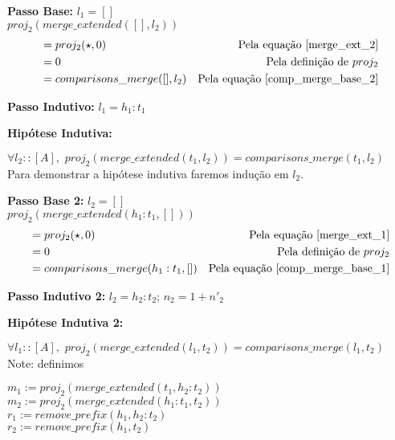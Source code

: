 \documentclass[12pt, oneside, a4paper,english,brazil]{abntex2}
\begin{document}
\textbf{Passo Base: } $l_{1} = []$\\

$proj_{2}(merge\_extended([], l_{2}))$
\begin{align*}
  &= proj_{2}(\star, 0) &\text{Pela equa\c{c}\~ao \ref{merge_ext_2}} \\
                                       &= 0 &\text{Pela defini\c{c}\~ao de $proj_{2}$} \\
  &= comparisons\_merge([], l_{2}) &\text{Pela equa\c{c}\~ao \ref{comp_merge_base_2}} \\
\end{align*}

\textbf{Passo Indutivo: } $l_{1} = h_{1} : t_{1}$

\textbf{Hip\'otese Indutiva: }


\qquad $\forall l_{2} :: [A], \,\, proj_{2}(merge\_extended(t_{1}, l_{2})) = comparisons\_merge(t_{1}, l_{2})$ \\

Para demonstrar a hip\'otese indutiva faremos indu\c{c}\~ao em $l_{2}$.

\textbf{Passo Base 2: } $l_{2} = []$\\

$proj_{2}(merge\_extended(h_{1} : t_{1}, []))$
\begin{align*}
   &= proj_{2}(\star, 0) &\text{Pela equa\c{c}\~ao \ref{merge_ext_1}} \\
                                               &= 0 &\text{Pela defini\c{c}\~ao de $proj_{2}$} \\
  &= comparisons\_merge(h_{1} : t_{1}, []) &\text{Pela equa\c{c}\~ao \ref{comp_merge_base_1}}
\end{align*}

\textbf{Passo Indutivo 2: } $l_{2} = h_{2} : t_{2}$; $n_{2} = 1 + n'_{2}$

\textbf{Hip\'otese Indutiva 2: }

\qquad $\forall l_{1} :: [A], \,\, proj_{2}(merge\_extended(l_{1}, t_{2})) = comparisons\_merge(l_{1}, t_{2})$ \\

Note: definimos
\begin{center}
$m_{1} := proj_{2}(merge\_extended(t_{1}, h_{2} : t_{2}))$\\
$m_{2} := proj_{2}(merge\_extended(h_{1} : t_{1}, t_{2}))$\\
$r_{1} := remove\_prefix(h_{1}, h_{2} : t_{2})$\\
$r_{2} := remove\_prefix(h_{1}, t_{2})$
\end{center}
\end{document}
